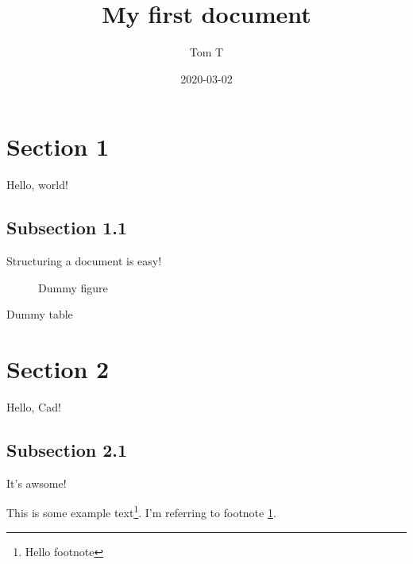 \documentclass{article}
\title{My first document}
\date{2020-03-02}
\author{Tom T}
\begin{document}
    \maketitle

    \newpage
    \tableofcontents

    \newpage
    \begin{appendix}
        \listoffigures
        \listoftables
    \end{appendix}
    

    \newpage

    \section{Section 1}
    Hello, world!

    \subsection{Subsection 1.1}
    Structuring a document is easy!

    \begin{figure}
        \caption{Dummy figure}
    \end{figure}

    \begin{table}
        \caption{Dummy table}
    \end{table}

    \section{Section 2}
    Hello, Cad!

    \subsection{Subsection 2.1}
    It's awsome!

    This is some example text\footnote{\label{myfootnote}Hello footnote}.
    I'm referring to footnote \ref{myfootnote}.
    
\end{document}
